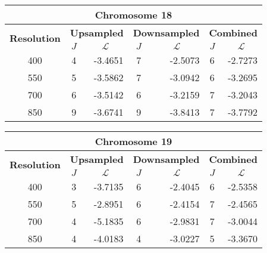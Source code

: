 \begin{table}[h!]
  \centering
\begin{tabular}{|c|c|r|c|r|c|r|}\hline
\multicolumn{7}{|c|}{\textbf{Chromosome 18}} \\ \hline
\multirow{2}{*}{\textbf{Resolution}} & \multicolumn{2}{|c|}{\textbf{Upsampled}} &  \multicolumn{2}{|c|}{\textbf{Downsampled}} &  \multicolumn{2}{|c|}{\textbf{Combined}} \\ \cline{2-7}
    & $J$ & \multicolumn{1}{|c|}{\textbf{$\mathcal{L}$}} & $J$ & \multicolumn{1}{|c|}{\textbf{$\mathcal{L}$}} &$J$ & \multicolumn{1}{|c|}{\textbf{$\mathcal{L}$}}   \\ \hline
400 & 4 & -3.4651 & 7 & -2.5073 & 6 & -2.7273  \\ \hline
550 & 5 & -3.5862 & 7 & -3.0942 & 6 & -3.2695  \\ \hline
700 & 6 & -3.5142 & 6 & -3.2159 & 7 & -3.2043  \\ \hline
850 & 9 & -3.6741 & 9 & -3.8413 & 7 & -3.7792  \\ \hline
\end{tabular}
\end{table}



\begin{table}[h!]
  \centering
\begin{tabular}{|c|c|r|c|r|c|r|}\hline
\multicolumn{7}{|c|}{\textbf{Chromosome 19}} \\ \hline
\multirow{2}{*}{\textbf{Resolution}} & \multicolumn{2}{|c|}{\textbf{Upsampled}} &  \multicolumn{2}{|c|}{\textbf{Downsampled}} &  \multicolumn{2}{|c|}{\textbf{Combined}} \\ \cline{2-7}
    & $J$ & \multicolumn{1}{|c|}{\textbf{$\mathcal{L}$}} & $J$ & \multicolumn{1}{|c|}{\textbf{$\mathcal{L}$}} &$J$ & \multicolumn{1}{|c|}{\textbf{$\mathcal{L}$}}   \\ \hline
400 & 3 & -3.7135 & 6 & -2.4045 & 6 & -2.5358  \\ \hline
550 & 5 & -2.8951 & 6 & -2.4154 & 7 & -2.4565  \\ \hline
700 & 4 & -5.1835 & 6 & -2.9831 & 7 & -3.0044  \\ \hline
850 & 4 & -4.0183 & 4 & -3.0227 & 5 & -3.3670  \\ \hline
\end{tabular}
\end{table}

